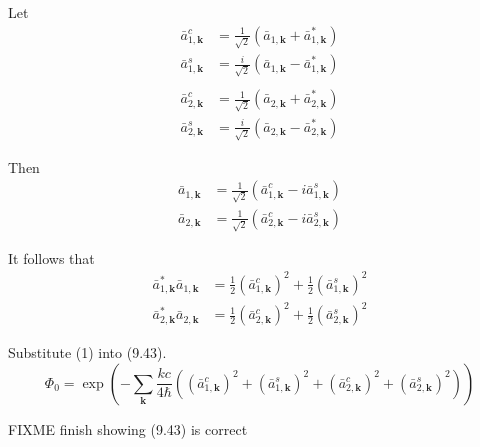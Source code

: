 


\bigskip
Let
\begin{align*}
\bar a_{1,\mathbf k}^c&=\frac{1}{\sqrt2}(\bar a_{1,\mathbf k}+\bar a_{1,\mathbf k}^*)
\\
\bar a_{1,\mathbf k}^s&=\frac{i}{\sqrt2}(\bar a_{1,\mathbf k}-\bar a_{1,\mathbf k}^*)
\\
\\
\bar a_{2,\mathbf k}^c&=\frac{1}{\sqrt2}(\bar a_{2,\mathbf k}+\bar a_{2,\mathbf k}^*)
\\
\bar a_{2,\mathbf k}^s&=\frac{i}{\sqrt2}(\bar a_{2,\mathbf k}-\bar a_{2,\mathbf k}^*)
\end{align*}

Then
\begin{align*}
\bar a_{1,\mathbf k}&=\frac{1}{\sqrt2}(\bar a_{1,\mathbf k}^c-i\bar a_{1,\mathbf k}^s)
\\
\bar a_{2,\mathbf k}&=\frac{1}{\sqrt2}(\bar a_{2,\mathbf k}^c-i\bar a_{2,\mathbf k}^s)
\end{align*}

It follows that
\begin{equation*}
\begin{aligned}
\bar a_{1,\mathbf k}^*\bar a_{1,\mathbf k}
&=\frac{1}{2}(\bar a_{1,\mathbf k}^c)^2+\frac{1}{2}(\bar a_{1,\mathbf k}^s)^2
\\
\bar a_{2,\mathbf k}^*\bar a_{2,\mathbf k}
&=\frac{1}{2}(\bar a_{2,\mathbf k}^c)^2+\frac{1}{2}(\bar a_{2,\mathbf k}^s)^2
\end{aligned}
\tag{1}
\end{equation*}

Substitute (1) into (9.43).
\begin{equation*}
\Phi_0=\exp\left(
-\sum_{\mathbf k}
\frac{kc}{4\hbar}
\left(
(\bar a_{1,\mathbf k}^c)^2+(\bar a_{1,\mathbf k}^s)^2
+
(\bar a_{2,\mathbf k}^c)^2+(\bar a_{2,\mathbf k}^s)^2
\right)
\right)
\end{equation*}

FIXME finish showing (9.43) is correct


